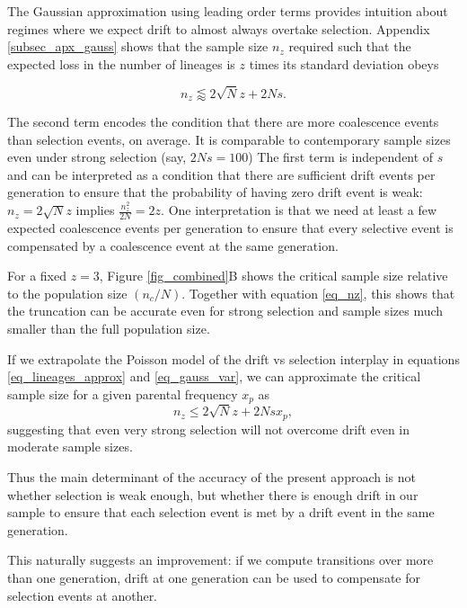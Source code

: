 \documentclass[review,nonatbib]{elsarticle}
\begin{document}
The Gaussian approximation using leading order terms provides intuition about regimes where we
expect drift to almost always overtake selection.  Appendix \ref{subsec_apx_gauss} shows that the sample size
$n_z$ required such that the expected loss in the number of lineages is $z$ times its standard deviation
obeys

\begin{equation}
  n_z \lessapprox 2 \sqrt{N} z + 2N s.
\label{eq_nz}
\end{equation}


The second term
encodes the condition that there are more coalescence events than selection events, on average. 
It is comparable to contemporary sample sizes even under strong selection (say, $2Ns=100$)
The
first term is independent of $s$ and can be interpreted as a condition that there are sufficient
drift events per generation to ensure that the probability of having zero drift event is weak: $n_z
= 2 \sqrt N z$ implies $\frac{n_z^2}{2N}= 2 z$. One interpretation is that we need at least a few
expected coalescence events per generation to ensure that every selective event is compensated by a
coalescence event at the same generation.

 For a fixed $z=3$, Figure \ref{fig_combined}B shows the critical sample size relative to the population size
 $(n_c/N)$. Together with equation \ref{eq_nz}, this shows
that the truncation can be accurate even for strong selection and sample sizes much smaller than
the full population size.

If we extrapolate the Poisson model of the drift vs selection interplay in equations \eqref{eq_lineages_approx} and \eqref{eq_gauss_var},
we can approximate the critical sample size for a given parental frequency $x_p$ as
\begin{equation*}
  n_z \leq 2 \sqrt{N} z + 2Nsx_p,
\end{equation*}
suggesting that even very strong selection will not overcome drift even in moderate sample sizes. 

Thus the main determinant of the accuracy of the present approach is not whether selection
is weak enough, but whether there is enough drift in our sample to ensure that each 
selection event is met by a drift event in the same generation. 

This naturally suggests an improvement: if we compute transitions over more than one generation, 
drift at one generation can be used to compensate for selection events at another. 
 
\end{document}
